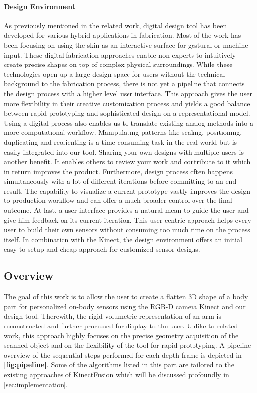 \paragraph*{Design Environment}
As previously mentioned in the related work, digital design tool has been developed for various hybrid applications in fabrication. Most of the work has been focusing on using the skin as an interactive surface for gestural or machine input. These digital fabrication approaches enable non-experts to intuitively create precise shapes on top of complex physical surroundings. While these technologies open up a large design space for users without the technical background to the fabrication process, there is not yet a pipeline that connects the design process with a higher level user interface. This approach gives the user more flexibility in their creative customization process and yields a good balance between rapid prototyping and sophisticated design on a representational model.\\
Using a digital process also enables us to translate existing analog methods into a more computational workflow. Manipulating patterns like scaling, positioning, duplicating and reorienting is a time-consuming task in the real world but is easily integrated into our tool. Sharing your own designs with multiple users is another benefit. It enables others to review your work and contribute to it which in return improves the product. Furthermore, design process often happens simultaneously with a lot of different iterations before committing to an end result. The capability to visualize a current prototype vastly improves the design-to-production workflow and can offer a much broader control over the final outcome. At last, a user interface provides a natural mean to guide the user and give him feedback on its current iteration. This user-centric approach helps every user to build their own sensors without consuming too much time on the process itself. In combination with the Kinect, the design environment offers an initial easy-to-setup and cheap approach for customized sensor designs.

\subsection{Overview}
\label{subsec:overview}
The goal of this work is to allow the user to create a flatten 3D shape of a body part for personalized on-body sensors using the RGB-D camera Kinect and our design tool. Therewith, the rigid volumetric representation of an arm is reconstructed and further processed for display to the user. Unlike to related work, this approach highly focuses on the precise geometry acquisition of the scanned object and on the flexibility of the tool for rapid prototyping. A pipeline overview of the sequential steps performed for each depth frame is depicted in \textbf{\autoref{fig:pipeline}}. Some of the algorithms listed in this part are tailored to the existing approaches of KinectFusion \cite{Izadi:2011:KRR:2047196.2047270} which will be discussed profoundly in \autoref{sec:implementation}.\newpara

